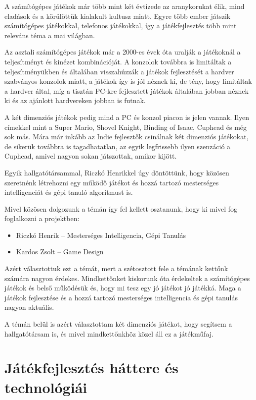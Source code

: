 \documentclass[]{thesis-ekf}
\theoremstyle{definition}
\begin{document}
	A számítógépes játékok már több mint két évtizede az aranykorukat élik, mind eladások és a körülöttük kialakult kultusz miatt. Egyre több ember játszik számítógépes játékokkal, telefonos játékokkal, így a játékfejlesztés több mint releváns téma a mai világban.
	
	Az asztali számítógépes játékok már a 2000-es évek óta uralják a játékoknál a teljesítményt és kinézet kombinációját. A konzolok továbbra is limitáltak a teljesítményükben és általában visszahúzzák a játékok fejlesztését a hardver szabványos konzolok miatt, a játékok így is jól néznek ki, de tény, hogy limitáltak a hardver által, míg a tisztán PC-kre fejlesztett játékok általában jobban néznek ki és az ajánlott hardvereken jobban is futnak.
	
	A két dimenziós játékok pedig mind a PC és konzol piacon is jelen vannak. Ilyen címekkel mint a Super Mario, Shovel Knight, Binding of Isaac, Cuphead és még sok más. Mára már inkább az Indie fejlesztők csinálnak két dimenziós játékokat, de sikerük továbbra is tagadhatatlan, az egyik legfrissebb ilyen szenzáció a Cuphead, amivel nagyon sokan játszottak, amikor kijött.
	
	Egyik hallgatótársammal, Riczkó Henrikkel úgy döntöttünk, hogy közösen szeretnénk létrehozni egy működő játékot és hozzá tartozó mesterséges intelligenciát és gépi tanuló algoritmust is.
	
	Mivel közösen dolgozunk a témán így fel kellett osztanunk, hogy ki mivel fog foglalkozni a projektben:
	\begin{itemize}
		\item Riczkó Henrik -- Mesterséges Intelligencia, Gépi Tanulás
		\item Kardos Zsolt -- Game Design
	\end{itemize}

	Azért választottuk ezt a témát, mert a szétosztott fele a témának kettőnk számára nagyon érdekes. Mindkettőnket kiskorunk óta érdekeltek a számítógépes játékok és belső működésük és, hogy mi tesz egy jó játékot jó játékká. Maga a játékok fejlesztése és a hozzá tartozó mesterséges intelligencia és gépi tanulás nagyon aktuális.
	
	A témán belül is azért választottam két dimenziós játékot, hogy segítsem a hallgatótársam is, és mivel mindkettőnkhöz közel áll ez a játékműfaj.
	
	\chapter{Játékfejlesztés háttere és technológiái}
\end{document}
